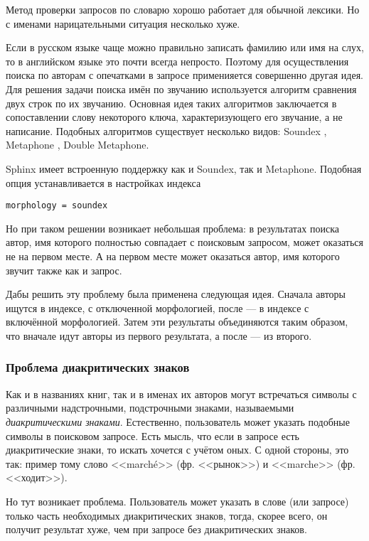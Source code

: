 Метод проверки запросов по словарю хорошо работает для обычной лексики. Но с именами нарицательными ситуация несколько хуже.

Если в русском языке чаще можно правильно записать фамилию или имя на слух, то в английском языке это почти всегда непросто.
Поэтому для осуществления поиска по авторам с опечатками в запросе применияется совершенно другая идея.
Для решения задачи поиска имён по звучанию используется алгоритм сравнения двух строк по их звучанию.
Основная идея таких алгоритмов заключается в сопоставлении слову некоторого ключа, характеризующего его звучание, а не написание.
Подобных алгоритмов существует несколько видов: Soundex \cite{soundex}, Metaphone \cite{metaphone}, Double Metaphone.

Sphinx имеет встроенную поддержку как и Soundex, так и Metaphone. Подобная опция устанавливается в настройках индекса
\begin{verbatim}
morphology = soundex
\end{verbatim}

Но при таком решении возникает небольшая проблема: в результатах поиска автор, имя которого полностью совпадает с поисковым запросом, может оказаться не на первом месте. А на первом месте может оказаться автор, имя которого звучит также как и запрос.

Дабы решить эту проблему была применена следующая идея. 
Сначала авторы ищутся в индексе, с отключенной морфологией, после --- в индексе с включённой морфологией.
Затем эти результаты объединяются таким образом, что вначале идут авторы из первого результата, а после --- из второго.

\subsubsection{Проблема диакритических знаков}

Как и в названиях книг, так и в именах их авторов могут встречаться символы с различными надстрочными, подстрочными знаками, называемыми {\em диакритическими знаками}. Естественно, пользователь может указать подобные символы в поисковом запросе.
Есть мысль, что если в запросе есть диакритические знаки, то искать хочется с учётом оных. С одной стороны, это так: пример тому слово <<marché>> (фр. <<рынок>>) и <<marche>> (фр. <<ходит>>). 

Но тут возникает проблема. Пользователь может указать в слове (или запросе) только часть необходимых диакритических знаков, тогда, скорее всего, он получит результат хуже, чем при запросе без диакритических знаков. 

